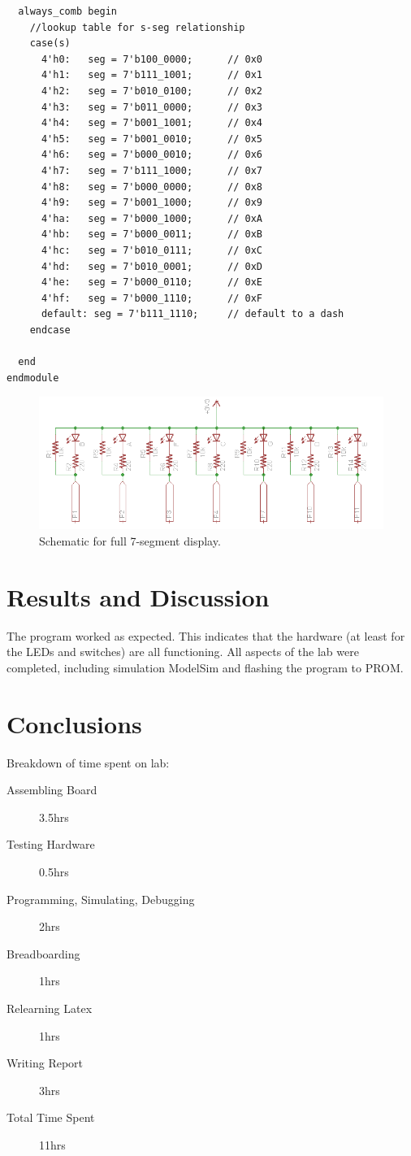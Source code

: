 \documentclass[11pt]{article}
\begin{document}
\begin{verbatim}
  always_comb begin
    //lookup table for s-seg relationship
    case(s)
      4'h0:   seg = 7'b100_0000;      // 0x0
      4'h1:   seg = 7'b111_1001;      // 0x1
      4'h2:   seg = 7'b010_0100;      // 0x2
      4'h3:   seg = 7'b011_0000;      // 0x3
      4'h4:   seg = 7'b001_1001;      // 0x4
      4'h5:   seg = 7'b001_0010;      // 0x5
      4'h6:   seg = 7'b000_0010;      // 0x6
      4'h7:   seg = 7'b111_1000;      // 0x7
      4'h8:   seg = 7'b000_0000;      // 0x8
      4'h9:   seg = 7'b001_1000;      // 0x9
      4'ha:   seg = 7'b000_1000;      // 0xA
      4'hb:   seg = 7'b000_0011;      // 0xB
      4'hc:   seg = 7'b010_0111;      // 0xC
      4'hd:   seg = 7'b010_0001;      // 0xD
      4'he:   seg = 7'b000_0110;      // 0xE
      4'hf:   seg = 7'b000_1110;      // 0xF
      default: seg = 7'b111_1110;     // default to a dash
    endcase
   
  end
endmodule

\end{verbatim}


\begin{figure}[h!]
\centering
\includegraphics[scale=0.8]{seven_segment.png}
\caption{Schematic for full 7-segment display.}
\label{figure:seven_segment}
\end{figure} 


\clearpage

\section{Results and Discussion}

The program worked as expected. This indicates that the hardware (at least for the LEDs and switches) are all functioning. All aspects of the lab were completed, including simulation ModelSim and flashing the program to PROM. 



\section{Conclusions}

Breakdown of time spent on lab:
\begin{description}
	\item[Assembling Board] 3.5hrs
	\item[Testing Hardware] 0.5hrs
	\item[Programming, Simulating, Debugging] 2hrs
	\item[Breadboarding] 1hrs
	\item[Relearning Latex] 1hrs
	\item[Writing Report] 3hrs
	\item[Total Time Spent] 11hrs
\end{description}
\end{document}
